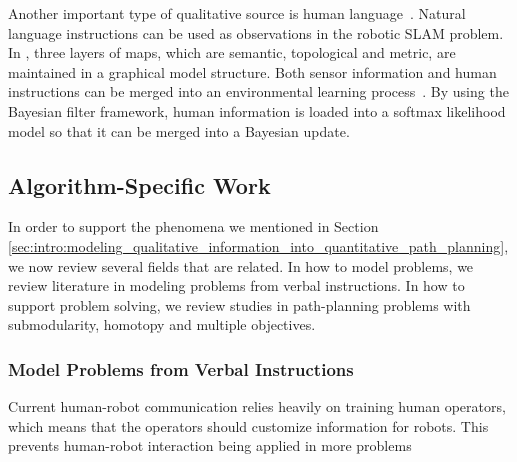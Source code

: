 \documentclass[phd]{byuprop}
\begin{document}
Another important type of qualitative source is human language~\cite{tellex2011understanding,walter2014framework}.
Natural language instructions can be used as observations in the robotic SLAM problem.
In \cite{walter2014framework}, three layers of maps, which are semantic, topological and metric, are maintained in a graphical model structure.
Both sensor information and human instructions can be merged into an environmental learning process~\cite{6301744,5509521,ahmed2014enabling}.
By using the Bayesian filter framework, human information is loaded into a softmax likelihood model so that it can be merged into a Bayesian update.

\subsection{Algorithm-Specific Work} 
\label{sec:related_work:algorithm_specific_work}

In order to support the phenomena we mentioned in Section \ref{sec:intro:modeling_qualitative_information_into_quantitative_path_planning}, we now review several fields that are related.
In how to model problems, we review literature in modeling problems from verbal instructions.
In how to support problem solving, we review studies in path-planning problems with submodularity, homotopy and multiple objectives.

\subsubsection{Model Problems from Verbal Instructions}
\label{sec:related_work:algorithm_specific_work:model_problems_from_verbal_instructions}

Current human-robot communication relies heavily on training human operators, which means that the operators should customize information for robots.
This prevents human-robot interaction being applied in more problems
\end{document}
